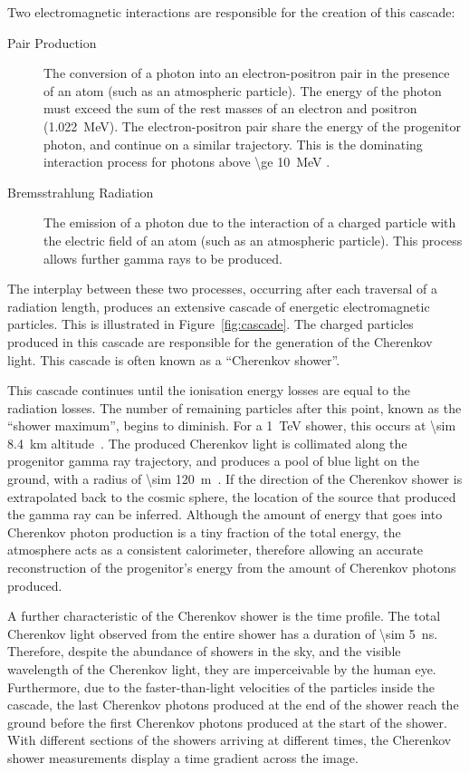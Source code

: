 Two electromagnetic interactions are responsible for the creation of this cascade:
\begin{description}
\item [Pair Production] The conversion of a photon into an electron-positron pair in the presence of an atom (such as an atmospheric particle). The energy of the photon must exceed the sum of the rest masses of an electron and positron (\SI{1.022}{MeV}). The electron-positron pair share the energy of the progenitor photon, and continue on a similar trajectory. This is the dominating interaction process for photons above \SI{\ge 10}{MeV} \cite{Weekes2003}.
\item [Bremsstrahlung Radiation] The emission of a photon due to the interaction of a charged particle with the electric field of an atom (such as an atmospheric particle). This process allows further gamma rays to be produced.
\end{description}
The interplay between these two processes, occurring after each traversal of a radiation length, produces an extensive cascade of energetic electromagnetic particles. This is illustrated in Figure~\ref{fig:cascade}. The charged particles produced in this cascade are responsible for the generation of the Cherenkov light. This cascade is often known as a ``Cherenkov shower''.

This cascade continues until the ionisation energy losses are equal to the radiation losses. The number of remaining particles after this point, known as the ``shower maximum'', begins to diminish. For a \SI{1}{TeV} shower, this occurs at \SI{\sim 8.4}{km} altitude~\cite{Weekes2003}. The produced Cherenkov light is collimated along the progenitor gamma ray trajectory, and produces a pool of blue light on the ground, with a radius of \SI{\sim 120}{m}~\cite{Hillas1996a}. If the direction of the Cherenkov shower is extrapolated back to the cosmic sphere, the location of the source that produced the gamma ray can be inferred. Although the amount of energy that goes into Cherenkov photon production is a tiny fraction of the total energy, the atmosphere acts as a consistent calorimeter, therefore allowing an accurate reconstruction of the progenitor's energy from the amount of Cherenkov photons produced. 

A further characteristic of the Cherenkov shower is the time profile. The total Cherenkov light observed from the entire shower has a duration of \SI{\sim 5}{ns}. Therefore, despite the abundance of showers in the sky, and the visible wavelength of the Cherenkov light, they are imperceivable by the human eye. Furthermore, due to the faster-than-light velocities of the particles inside the cascade, the last Cherenkov photons produced at the end of the shower reach the ground before the first Cherenkov photons produced at the start of the shower. With different sections of the showers arriving at different times, the Cherenkov shower measurements display a time gradient across the image. 

